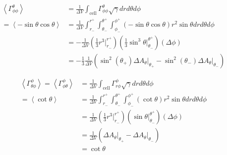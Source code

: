 \begin{align}
\left<\Gamma^{\theta}_{\phi \phi} \right> &= \frac{1}{\Delta V} \int_{\text{cell}} \Gamma^{\theta}_{\phi \phi} \sqrt{\gamma} dr d\theta d\phi \\
          = \left< {-\sin \theta \cos \theta }\right> &= \frac{1}{\Delta V} \int_{r_-}^{r^+} \int_{\theta_-}^{\theta^+} \int_{\phi_-}^{\phi^+} (-\sin \theta \cos \theta) r^2 \sin \theta dr d\theta d\phi \\
         &= - \frac{1}{\Delta V} \left( \frac{1}{3} r^3 \Big|_{r_-}^{r^+} \right) \left( \frac{1}{3} \sin^3 \theta \Big|_{\theta_-}^{\theta^+} \right) \left( \Delta \phi \right) \\
	 &= - \frac{1}{3} \frac{1}{\Delta V} \left( \sin^2 (\theta_+) \Delta A_\theta\Big|_{\theta_+} - \sin^2 (\theta_-) \Delta A_\theta \Big|_{\theta_-} \right)
\end{align}

\begin{align}
\left<\Gamma^{\phi}_{\theta \phi} \right> = \left<\Gamma^{\phi}_{\phi \theta } \right> &= \frac{1}{\Delta V} \int_{\text{cell}} \Gamma^{\phi}_{r \phi} \sqrt{\gamma} dr d\theta d\phi \\
          = \left< {\cot \theta}\right> &= \frac{1}{\Delta V} \int_{r_-}^{r^+} \int_{\theta_-}^{\theta^+} \int_{\phi_-}^{\phi^+} (\cot \theta) r^2 \sin \theta dr d\theta d\phi \\
         &= \frac{1}{\Delta V} \left( \frac{1}{3} r^3 \Big|_{r_-}^{r^+} \right) \left( \sin \theta \Big|_{\theta_-}^{\theta^+} \right) \left( \Delta \phi \right) \\
	 &= \frac{1}{\Delta V} \left( \Delta A_\theta\Big|_{\theta_+} - \Delta A_\theta \Big|_{\theta_-} \right) \\
         &= \cot \theta
\end{align}

